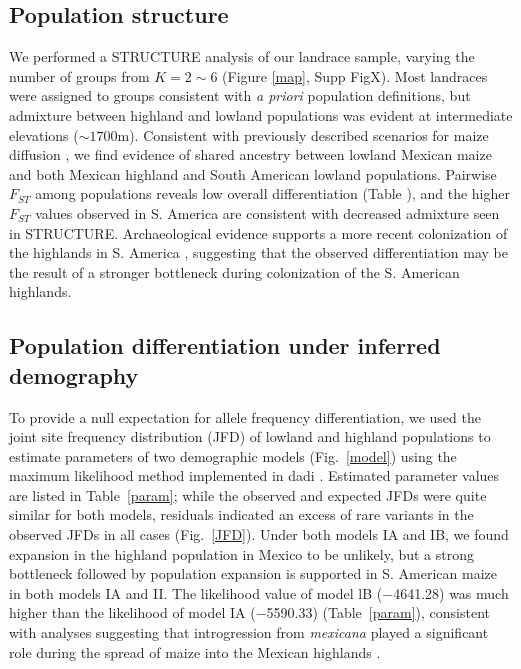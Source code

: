 \subsection*{Population structure}

We performed a {\sf STRUCTURE} analysis \cite[]{Pritchard_2000_10835412,Falush_2003_12930761} of our landrace sample, varying the number of groups from $K=2\sim 6$ (Figure \ref{map}, Supp FigX). 
Most landraces were assigned to groups consistent with \emph{a priori} population definitions, but admixture between highland and lowland populations was evident at intermediate elevations ($\sim1700$m).  Consistent with previously described scenarios for maize diffusion \cite[]{Piperno_2006_69}, we find evidence of shared ancestry between lowland Mexican maize and both Mexican highland and South American lowland populations.  Pairwise $F_{ST}$ among populations reveals low overall differentiation (Table \label{FstP}), and the higher $F_{ST}$ values observed in S. America are consistent with decreased admixture seen in STRUCTURE.  Archaeological evidence supports a more recent colonization of the highlands in S. America  \cite[]{Piperno_2006_69,Perry_2006_16511492,Grobman_2012_22307642}, suggesting that the observed differentiation may be the result of a stronger  bottleneck during colonization of the S. American highlands. 

\subsection*{Population differentiation under inferred demography}

To provide a null expectation for allele frequency differentiation, we used the joint site frequency distribution (JFD) of lowland and highland populations to estimate parameters of two demographic models (Fig.~\ref{model}) using the maximum likelihood method implemented in {\sf dadi} \cite[]{Gutenkunst_2009_19851460}.  
Estimated parameter values are listed in Table~\ref{param}; while the observed and expected JFDs were quite similar for both models,  residuals indicated an excess of rare variants in the observed JFDs in all cases (Fig.~\ref{JFD}). 
Under both models IA and IB,  we found expansion in the highland population in Mexico to be unlikely, but a strong bottleneck followed by population expansion is supported in S. American maize in both models IA and II.  
The likelihood value of model lB ($-$4641.28) was much higher than the likelihood of model IA ($-$5590.33) (Table~\ref{param}), consistent with analyses suggesting that introgression from \emph{mexicana} played a significant role during the spread of maize into the Mexican highlands \cite{Profford_2013}. 

